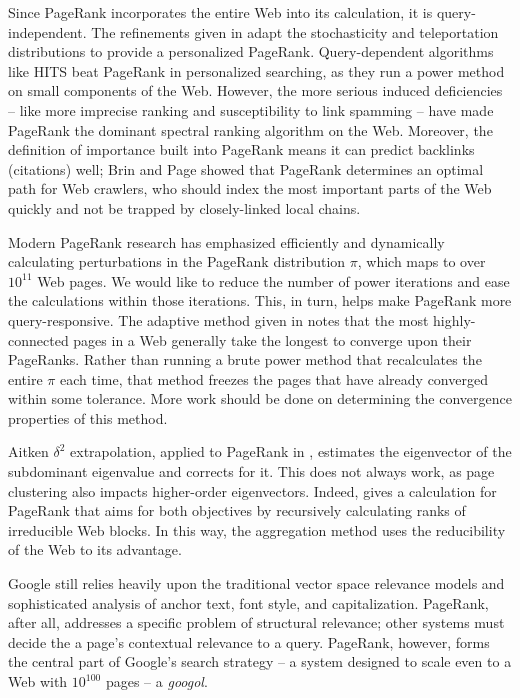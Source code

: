 \documentclass[../exploring-pagerank.tex]{subfiles}
\begin{document}
	Since PageRank incorporates the entire Web into its calculation, it is query-independent. The refinements given in \cite{haveliwalaAnalyticalComparisonApproaches2003} adapt the stochasticity and teleportation distributions to provide a personalized PageRank. Query-dependent algorithms like HITS beat PageRank in personalized searching, as they run a power method on small components of the Web. However, the more serious induced deficiencies -- like more imprecise ranking and susceptibility to link spamming -- have made PageRank the dominant spectral ranking algorithm on the Web. Moreover, the definition of importance built into PageRank means it can predict backlinks (citations) well; Brin and Page \cite{brinPageRankCitationRanking1998} showed that PageRank determines an optimal path for Web crawlers, who should index the most important parts of the Web quickly and not be trapped by closely-linked local chains.

	Modern PageRank research has emphasized efficiently and dynamically calculating perturbations in the PageRank distribution $\pi$, which maps to over $10^{11}$ Web pages. We would like to reduce the number of power iterations and ease the calculations within those iterations. This, in turn, helps make PageRank more query-responsive. The adaptive method given in \cite{berkhinSurveyPageRankComputing2005} notes that the most highly-connected pages in a Web generally take the longest to converge upon their PageRanks. Rather than running a brute power method that recalculates the entire $\pi$ each time, that method freezes the pages that have already converged within some tolerance. More work should be done on determining the convergence properties of this method.

	Aitken $\delta^2$ extrapolation, applied to PageRank in \cite{langvilleGooglePageRankScience2006}, estimates the eigenvector of the subdominant eigenvalue and corrects for it. This does not always work, as page clustering also impacts higher-order eigenvectors. Indeed, \cite{kamvarExploitingBlockStructure2003} gives a calculation for PageRank that aims for both objectives by recursively calculating ranks of irreducible Web blocks. In this way, the aggregation method uses the reducibility of the Web to its advantage.

    Google still relies heavily upon the traditional vector space relevance models and sophisticated analysis of anchor text, font style, and capitalization. PageRank, after all, addresses a specific problem of structural relevance; other systems must decide the a page's contextual relevance to a query. PageRank, however, forms the central part of Google's search strategy -- a system designed to scale even to a Web with $10^{100}$ pages -- a \textit{googol}.
\end{document}
